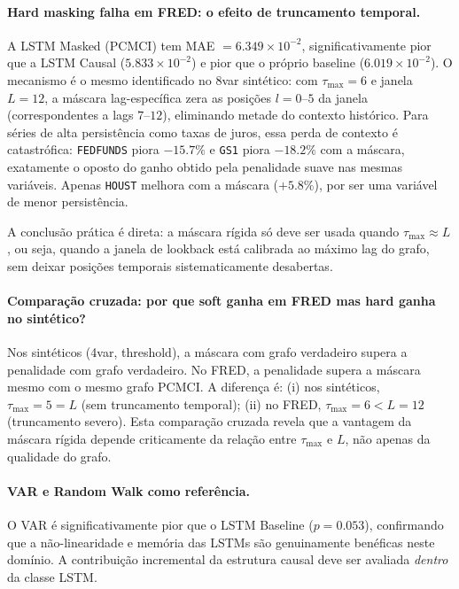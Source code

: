 \documentclass[12pt, a4paper]{article}
\begin{document}
\paragraph{Hard masking falha em FRED: o efeito de truncamento temporal.}
A LSTM Masked (PCMCI) tem MAE $= 6.349 \times 10^{-2}$, significativamente pior que a LSTM Causal ($5.833 \times 10^{-2}$) e pior que o próprio baseline ($6.019 \times 10^{-2}$). O mecanismo é o mesmo identificado no 8var sintético: com $\tau_{\max} = 6$ e janela $L = 12$, a máscara lag-específica zera as posições $l = 0$--$5$ da janela (correspondentes a lags $7$--$12$), eliminando metade do contexto histórico. Para séries de alta persistência como taxas de juros, essa perda de contexto é catastrófica: \texttt{FEDFUNDS} piora $-15.7\%$ e \texttt{GS1} piora $-18.2\%$ com a máscara, exatamente o oposto do ganho obtido pela penalidade suave nas mesmas variáveis. Apenas \texttt{HOUST} melhora com a máscara ($+5.8\%$), por ser uma variável de menor persistência.

A conclusão prática é direta: a máscara rígida só deve ser usada quando $\tau_{\max} \approx L$ , ou seja, quando a janela de lookback está calibrada ao máximo lag do grafo, sem deixar posições temporais sistematicamente desabertas.

\paragraph{Comparação cruzada: por que soft ganha em FRED mas hard ganha no sintético?}
Nos sintéticos (4var, threshold), a máscara com grafo verdadeiro supera a penalidade com grafo verdadeiro. No FRED, a penalidade supera a máscara mesmo com o mesmo grafo PCMCI. A diferença é: (i) nos sintéticos, $\tau_{\max} = 5 = L$ (sem truncamento temporal); (ii) no FRED, $\tau_{\max} = 6 < L = 12$ (truncamento severo). Esta comparação cruzada revela que a vantagem da máscara rígida depende criticamente da relação entre $\tau_{\max}$ e $L$, não apenas da qualidade do grafo.

\paragraph{VAR e Random Walk como referência.}
O VAR é significativamente pior que o LSTM Baseline ($p = 0.053$), confirmando que a não-linearidade e memória das LSTMs são genuinamente benéficas neste domínio. A contribuição incremental da estrutura causal deve ser avaliada \emph{dentro} da classe LSTM.
\end{document}
